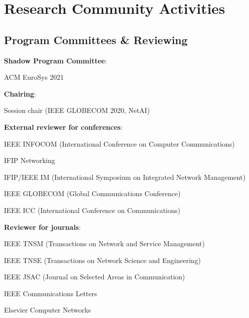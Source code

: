 \section{Research Community Activities}
\subsection{Program Committees \& Reviewing}
\begin{cvitemize}
	\item \textbf{Shadow Program Committee}:
	\begin{inlineItemize}
		\item ACM EuroSys 2021
	\end{inlineItemize}
	\item \textbf{Chairing}:
	\begin{inlineItemize}
		\item Session chair (IEEE GLOBECOM 2020, NetAI)
	\end{inlineItemize}
	\item \textbf{External reviewer for conferences}:
	\begin{inlineItemize}
		\item IEEE INFOCOM (International Conference on Computer Communications)
		\item IFIP Networking
		\item IFIP/IEEE IM (International Symposium on Integrated Network Management)
		\item IEEE GLOBECOM (Global Communications Conference)
		\item IEEE ICC (International Conference on Communications)
	\end{inlineItemize}
	\item \textbf{Reviewer for journals}:
	\begin{inlineItemize}
		\item IEEE TNSM (Transactions on Network and Service Management)
		\item IEEE TNSE (Transactions on Network Science and Engineering)
		\item IEEE JSAC (Journal on Selected Areas in Communication)
		\item IEEE Communications Letters
		\item Elsevier Computer Networks
	\end{inlineItemize}
\end{cvitemize}

\pagebreak


